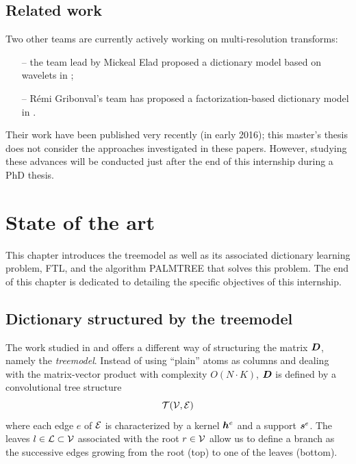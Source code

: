 \section{Related work}
Two other teams are currently actively working on multi-resolution transforms:
\begin{itemize}
	\item[--] the team lead by Mickeal Elad proposed a dictionary model based on wavelets in \cite{sulam_trainlets:_2016};
	\item[--] Rémi Gribonval’s team has proposed a factorization-based dictionary model in  \cite{le_magoarou_flexible_2016}.
\end{itemize}
Their work have been published very recently (in early 2016); this master's thesis does not consider the approaches investigated in these papers. However, studying these advances will be conducted just after the end of this internship during a PhD thesis.


\chapter{State of the art}
This chapter introduces the \Gls{treemodel} as well as its associated dictionary learning problem, \acs{FTL}, and the algorithm \ac{PALMTREE} that solves this problem. The end of this chapter is dedicated to detailing the specific objectives of this internship.

\section{Dictionary structured by the \Gls{treemodel}}\label{sec_tree_model}
The work studied in \cite{chabiron_toward_2015} and \cite{chabiron_optimization_2016} offers a different way of structuring the matrix $\bm{D}$, namely the \emph{\Gls{treemodel}}. Instead of using “plain” atoms as columns and dealing with the matrix-vector product with complexity $O(N \cdot K)$, $\bm{D}$ is defined by a convolutional tree structure \begin{equation*}\mathcal T(\mathcal V,\mathcal E)\end{equation*} where each edge $e$ of $\mathcal E$ is characterized by a kernel $\bm{h}^e$ and a support $\bm{s}^e$. The leaves $l \in \mathcal L \subset \mathcal V$ associated with the root $r \in \mathcal V$ allow us to define a branch as the successive edges growing from the root (top) to one of the leaves (bottom).

